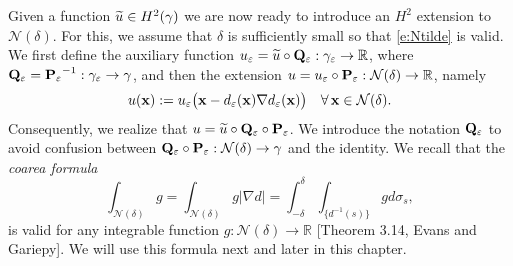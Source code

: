 Given a function $\widetilde{u}\in H^2(\gamma)$ we are now ready to introduce an
$H^2$ extension to ${\mathcal N(\delta)}$. 
For this, we assume that $\delta$ is sufficiently small so that
\eqref{e:Ntilde} is valid.
We first define the auxiliary function
$u_\varepsilon = \widetilde{u}\circ{\mathbf{Q}_{\ensuremath{\varepsilon}}}:{\gamma_\varepsilon}\to\mathbb{R}$, where
${\mathbf{Q}_{\varepsilon}}={{\bf P}_\varepsilon}^{-1}:{\gamma_\varepsilon}\to\gamma$, and then the
extension $u = u_\varepsilon\circ{{\bf P}_\varepsilon}:{\mathcal N(\delta)}\to\mathbb{R}$, namely
%
\begin{equation}\label{e:non_const_ext}
  u({\bf x}) := u_\varepsilon \big( {\bf x} - d_\varepsilon({\bf x}) \nabla d_\varepsilon({\bf x})   \big)
  \quad\forall \, {\bf x}\in{\mathcal N(\delta)}.
\end{equation}
%
Consequently, we realize that $u=\widetilde{u}\circ{\mathbf{Q}_{\ensuremath{\varepsilon}}}\circ{{\bf P}_\varepsilon}$.
We introduce the notation ${\mathbf{Q}_{\varepsilon}}$ to avoid
confusion between ${\mathbf{Q}_{\varepsilon}}\circ{{\bf P}_\varepsilon}:{\mathcal N(\delta)}\to\gamma$ and the identity.
We recall that the {\it coarea
formula}
%
\begin{equation}\label{e:coarea}
\int_{\mathcal N(\delta)} g  = \int_{\mathcal N(\delta)} g | \nabla d| =  \int_{-\delta}^{\delta} \int_{ \{ d^{-1}(s) \}} g d\sigma_s,
\end{equation}
is valid for any integrable function $g: \mathcal N(\delta) \rightarrow \mathbb R$
[Theorem 3.14, Evans and Gariepy]. We will use this formula next and later in
this chapter.
 
